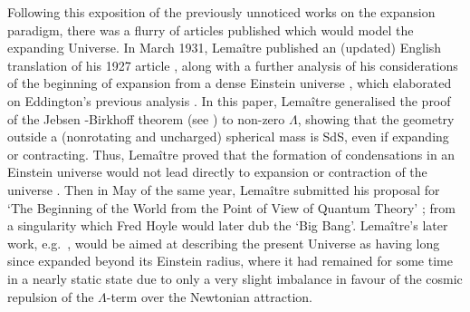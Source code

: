 Following this exposition of the previously unnoticed works on the expansion paradigm, there was a flurry of articles published which would model the expanding Universe. In March 1931, Lema\^{i}tre published an (updated) English translation of his 1927 article \cite{Lemaitre1931a}, along with a further analysis of his considerations of the beginning of expansion from a dense Einstein universe \cite{Lemaitre1931b}, which elaborated on Eddington's previous analysis \cite{Eddington1930}. In this paper, Lema\^{i}tre generalised the proof of the Jebsen \cite{Jebsen1921,Jebsen2005}-Birkhoff \cite{Birkhoff1923} theorem (see \cite{Deser2005}) to non-zero $\Lambda$, showing that the geometry outside a (nonrotating and uncharged) spherical mass is SdS, even if expanding or contracting. Thus, Lema\^{i}tre proved that the formation of condensations in an Einstein universe would not lead directly to expansion or contraction of the universe \cite{Lemaitre1931b}. Then in May of the same year, Lema\^{i}tre submitted his proposal for `The Beginning of the World from the Point of View of Quantum Theory' \cite{Lemaitre1931c}; from a singularity which Fred Hoyle would later dub the `Big Bang'. Lema\^{i}tre's later work, e.g.~\cite{Lemaitre1933,Lemaitre1997,Lemaitre1934}, would be aimed at describing the present Universe as having long since expanded beyond its Einstein radius, where it had remained for some time in a nearly static state due to only a very slight imbalance in favour of the cosmic repulsion of the $\Lambda$-term over the Newtonian attraction. 

